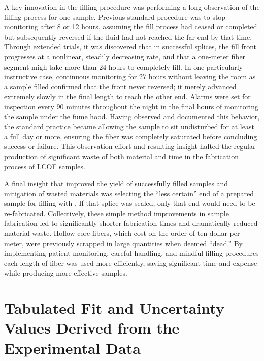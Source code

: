 A key innovation in the filling procedure was performing a long observation of the filling process for one sample. Previous standard procedure was to stop monitoring after 8 or 12 hours, assuming the fill process had ceased or completed but subsequently reversed if the fluid had not reached the far end by that time. Through extended trials, it was discovered that in successful splices, the fill front progresses at a nonlinear, steadily decreasing rate, and that a one-meter fiber segment migh take more than 24 hours to completely fill. In one particularly instructive case, continuous monitoring for 27 hours without leaving the room as a sample filled confirmed that the  front never reversed; it merely advanced extremely slowly in the final length to reach the other end. Alarms were set for inspection every 90 minutes throughout the night in the final hours of monitoring the sample under the fume hood. Having observed and documented this behavior, the standard practice became allowing the sample to sit undisturbed for at least a full day or more, ensuring the fiber was completely saturated before concluding success or failure. This observation effort and resulting insight halted the regular production of significant waste of both material and time in the fabrication process of \ac{LCOF} samples.

A final insight that improved the yield of successfully filled samples and mitigation of wasted materials was selecting the “less certain” end of a prepared sample for filling with . If that splice was sealed, only that end would need to be re-fabricated. Collectively, these simple method improvements in sample fabrication led to significantly shorter fabrication times and dramatically reduced material waste. Hollow-core fibers, which cost on the order of ten dollar per meter, were previously scrapped in large quantities when deemed “dead.” By implementing patient monitoring, careful handling, and mindful filling procedures each length of fiber was used more efficiently, saving significant time and expense while producing more effective samples.

\newpage

\section{Tabulated Fit and Uncertainty Values Derived from the Experimental Data}
\label{Cooling:Appendix:sec:Tabulated Fit and Uncertainty Values Derived From the Experimental Data}

